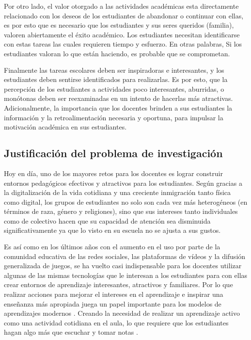 Por otro lado, el valor otorgado a las actividades académicas esta directamente relacionado con los deseos de
los estudiantes de abandonar o continuar con ellas, es por esto que es necesario que los estudiantes y sus 
seres queridos (familia), valoren abiertamente el éxito académico. Los estudiantes necesitan identificarse con 
estas tareas las cuales requieren tiempo y esfuerzo. En otras palabras, Si los estudiantes valoran lo que 
están haciendo, es probable que se comprometan.

Finalmente las tareas escolares deben ser inspiradoras e interesantes, y los estudiantes deben sentirse 
identificados para realizarlas. Es por esto, que la percepción de los estudiantes a actividades poco 
interesantes, aburridas, o monótonas deben ser reexaminadas en un intento de hacerlas más atractivas. 
Adicionalmente, la importancia que los docentes brinden a sus estudiantes la información y la 
retroalimentación necesaria y oportuna, para impulsar la motivación académica en sus estudiantes.

\subsection{Justificación del problema de investigación}

Hoy en día, uno de los mayores retos para los docentes es lograr construir entornos pedagógicos efectivos y 
atractivos para los estudiantes. Según  gracias a la digitalización de la vida cotidiana 
y una creciente inmigración tanto física como digital, los grupos de estudiantes no solo son cada vez más 
heterogéneos (en términos de raza, género y religiones), sino que sus intereses tanto individuales como de 
colectivo hacen que su capacidad de atención sea disminuida significativamente ya que lo visto en su escuela 
no se ajusta a sus gustos.

Es así como en los últimos años con el aumento en el uso por parte de la comunidad educativa de las redes 
sociales, las plataformas de vídeos y la difusión generalizada de juegos, se ha vuelto casi indispensable para 
los docentes utilizar algunas de las mismas tecnologías que le interesan a los estudiantes para con ellas 
crear entornos de aprendizaje interesantes, atractivos y familiares. Por lo que realizar acciones para mejorar 
el intereses en el aprendizaje e inspirar una enseñanza más apropiada juega un papel importante para los
modelos de aprendizajes modernos \cite{XU2017}. Creando la necesidad de realizar un aprendizaje activo como 
una actividad cotidiana en el aula, lo que requiere que los estudiantes hagan algo más que escuchar y tomar 
notas \cite{8190501}.

